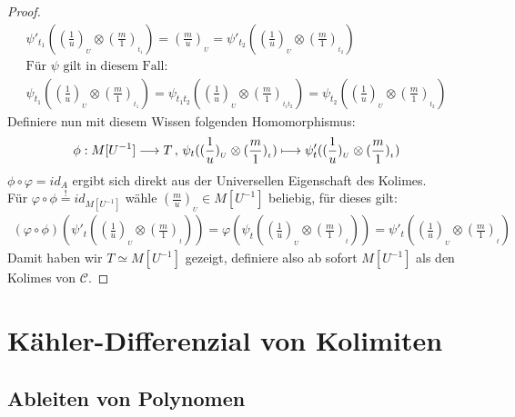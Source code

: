 \documentclass[10pt,a4paper]{report}
\newcommand{\function}[5]{\nolinebreak{#1:#2 \longrightarrow #3 \, , \, #4 \longmapsto #5}}
\newcommand{\tensor}[3]{#1 \otimes #3}
\newcommand{\lok}[2]{#1 [#2^{-1}]}
\newcommand{\loke}[3]{(\frac{#1}{#2})_{_{#3}}}
\newcommand*{\defshow}{\stackrel{!}{=}}
\begin{document}
\begin{proof}
\begin{gather*}
\psi'_{t_1}({\tensor{\loke{1}{u}{U}}{\lok{M}{t_1}}{\loke{m}{1}{t_1}}}) 
= \loke{m}{u}{U} 
= \psi'_{t_2}({\tensor{\loke{1}{u}{U}}{\lok{M}{t_2}}{\loke{m}{1}{t_2}}})\\
\text{Für $\psi$ gilt in diesem Fall: }\\
\psi_{t_1}({\tensor{\loke{1}{u}{U}}{\lok{M}{t_1}}{\loke{m}{1}{t_1}}})
= \psi_{t_1t_2}({\tensor{\loke{1}{u}{U}}{\lok{M}{t_1t_2}}{\loke{m}{1}{t_1t_2}}})
= \psi_{t_2}({\tensor{\loke{1}{u}{U}}{\lok{M}{t_2}}{\loke{m}{1}{t_2}}})
\end{gather*}
Definiere nun mit diesem Wissen folgenden Homomorphismus:
\begin{gather*}
\function{\phi}{\lok{M}{U}}{T}{\psi_t(\tensor{\loke{1}{u}{U}}{\lok{M}{t}}{\loke{m}{1}{t}})}{\psi'_t(\tensor{\loke{1}{u}{U}}{\lok{M}{t}}{\loke{m}{1}{t}})}
\end{gather*}
$\phi \circ \varphi = id_A$ ergibt sich direkt aus der Universellen Eigenschaft des Kolimes.\\
Für $\varphi \circ \phi \defshow id_{\lok{M}{U}}$ wähle $\loke{m}{u}{U} \in \lok{M}{U}$ beliebig, für dieses gilt:
\begin{gather*}
(\varphi \circ \phi) (\psi'_t(\tensor{\loke{1}{u}{U}}{\lok{M}{t}}{\loke{m}{1}{t}}))
 =\varphi(\psi_t(\tensor{\loke{1}{u}{U}}{\lok{M}{t}}{\loke{m}{1}{t}}))
  =\psi'_t(\tensor{\loke{1}{u}{U}}{\lok{M}{t}}{\loke{m}{1}{t}})
\end{gather*}
Damit haben wir $T \simeq \lok{M}{U}$ gezeigt, definiere also ab sofort $\lok{M}{U}$ als den Kolimes von $\mathcal{C}$.
\end{proof}


\section{Kähler-Differenzial von Kolimiten}
\subsection{Ableiten von Polynomen}
\end{document}
